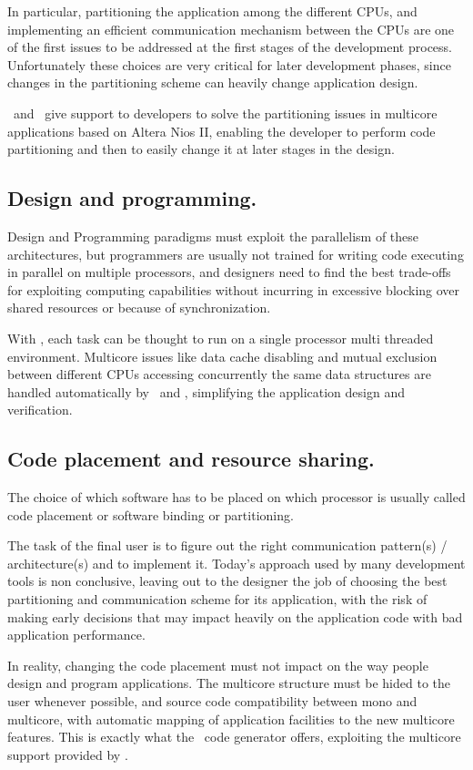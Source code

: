 In particular, partitioning the application among the different CPUs,
and implementing an efficient communication mechanism between the CPUs
are one of the first issues to be addressed at the first stages of the
development process. Unfortunately these choices are very critical for
later development phases, since changes in the partitioning scheme can
heavily change application design.

\rtd\ and \ee\ give support to developers to solve the partitioning
issues in multicore applications based on Altera Nios II,
enabling the developer to perform code partitioning and then to easily
change it at later stages in the design.

\subsection{Design and programming.} 
Design and Programming paradigms must exploit the parallelism of these
architectures, but programmers are usually not trained for writing
code executing in parallel on multiple processors, and designers need
to find the best trade-offs for exploiting computing capabilities
without incurring in excessive blocking over shared resources or
because of synchronization.

With \ee, each task can be thought to run on a single processor
multi threaded environment. Multicore issues like data cache
disabling and mutual exclusion between different CPUs accessing
concurrently the same data structures are handled automatically by
\rtd\ and \ee, simplifying the application design and
verification.

\subsection{Code placement and resource sharing.}
The choice of which software has to be placed on which processor is
usually called code placement or software binding or partitioning.

The task of the final user is to figure out the right communication
pattern(s) / architecture(s) and to implement it. Today's approach
used by many development tools is non conclusive, leaving out to the
designer the job of choosing the best partitioning and communication
scheme for its application, with the risk of making early decisions
that may impact heavily on the application code with bad application
performance.

In reality, changing the code placement must not impact on the way
people design and program applications. The multicore structure
must be hided to the user whenever possible, and source code
compatibility between mono and multicore, with automatic mapping
of application facilities to the new multicore features. This is
exactly what the \rtd\ code generator offers, exploiting the
multicore support provided by \ee.

